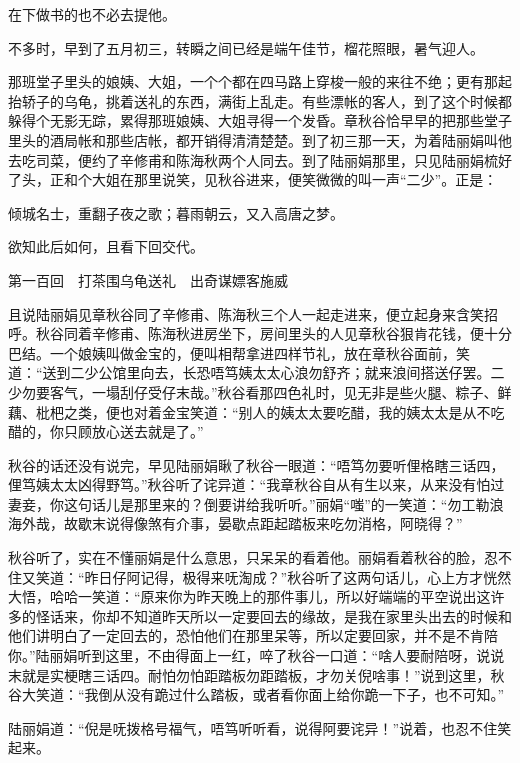 \documentclass[12pt,UTF8]{ctexbook}
\begin{document}
{{{在下做书的也不必去提他。

不多时，早到了五月初三，转瞬之间已经是端午佳节，榴花照眼，暑气迎人。

那班堂子里头的娘姨、大姐，一个个都在四马路上穿梭一般的来往不绝；更有那起抬轿子的乌龟，挑着送礼的东西，满街上乱走。有些漂帐的客人，到了这个时候都躲得个无影无踪，累得那班娘姨、大姐寻得一个发昏。章秋谷恰早早的把那些堂子里头的酒局帐和那些店帐，都开销得清清楚楚。到了初三那一天，为着陆丽娟叫他去吃司菜，便约了辛修甫和陈海秋两个人同去。到了陆丽娟那里，只见陆丽娟梳好了头，正和个大姐在那里说笑，见秋谷进来，便笑微微的叫一声“二少”。正是：

倾城名士，重翻子夜之歌；暮雨朝云，又入高唐之梦。

欲知此后如何，且看下回交代。





第一百回　打茶围乌龟送礼　出奇谋嫖客施威





且说陆丽娟见章秋谷同了辛修甫、陈海秋三个人一起走进来，便立起身来含笑招呼。秋谷同着辛修甫、陈海秋进房坐下，房间里头的人见章秋谷狠肯花钱，便十分巴结。一个娘姨叫做金宝的，便叫相帮拿进四样节礼，放在章秋谷面前，笑道：“送到二少公馆里向去，长恐唔笃姨太太心浪勿舒齐；就来浪间搭送仔罢。二少勿要客气，一塌刮仔受仔末哉。”秋谷看那四色礼时，见无非是些火腿、粽子、鲜藕、枇杷之类，便也对着金宝笑道：“别人的姨太太要吃醋，我的姨太太是从不吃醋的，你只顾放心送去就是了。”

秋谷的话还没有说完，早见陆丽娟瞅了秋谷一眼道：“唔笃勿要听俚格瞎三话四，俚笃姨太太凶得野笃。”秋谷听了诧异道：“我章秋谷自从有生以来，从来没有怕过妻妾，你这句话儿是那里来的？倒要讲给我听听。”丽娟“嗤”的一笑道：“勿工勒浪海外哉，故歇末说得像煞有介事，晏歇点距起踏板来吃勿消格，阿晓得？”

秋谷听了，实在不懂丽娟是什么意思，只呆呆的看着他。丽娟看着秋谷的脸，忍不住又笑道：“昨日仔阿记得，极得来呒淘成？”秋谷听了这两句话儿，心上方才恍然大悟，哈哈一笑道：“原来你为昨天晚上的那件事儿，所以好端端的平空说出这许多的怪话来，你却不知道昨天所以一定要回去的缘故，是我在家里头出去的时候和他们讲明白了一定回去的，恐怕他们在那里呆等，所以定要回家，并不是不肯陪你。”陆丽娟听到这里，不由得面上一红，啐了秋谷一口道：“啥人要耐陪呀，说说末就是实梗瞎三话四。耐怕勿怕距踏板勿距踏板，才勿关倪啥事！”说到这里，秋谷大笑道：“我倒从没有跪过什么踏板，或者看你面上给你跪一下子，也不可知。”

陆丽娟道：“倪是呒拨格号福气，唔笃听听看，说得阿要诧异！”说着，也忍不住笑起来。

}}}
\end{document}
